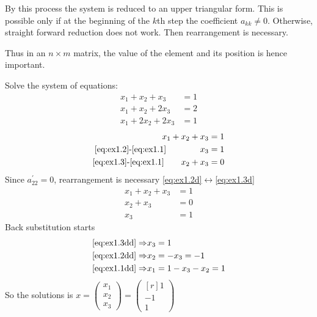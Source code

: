 \documentclass[12pt,class=book,crop=false]{standalone}
\begin{document}
By this process the system is reduced to an upper triangular form. This is possible only if at the beginning of the \( k \)th step the coefficient \( a_{kk} \neq 0\). Otherwise, straight forward reduction does not work. Then rearrangement is necessary.

Thus in an \( n\times m \) matrix, the value of the element and its position is hence important.
\begin{ex}
    Solve the system of equations:
    \begin{align}
        x_1+x_2+x_3   & = 1 \label{eq:ex1.1} \\
        x_1+x_2+2x_3  & = 2 \label{eq:ex1.2} \\
        x_1+2x_2+2x_3 & = 1 \label{eq:ex1.3}
    \end{align}
    \begin{align}
        x_1+x_2+x_3                                              & = 1 \label{eq:ex1.1d} \\
        \text{\eqref{eq:ex1.2}-\eqref{eq:ex1.1}}\qquad\qquad x_3 & = 1 \label{eq:ex1.2d} \\
        \text{\eqref{eq:ex1.3}-\eqref{eq:ex1.1}}\qquad x_2+x_3   & = 0 \label{eq:ex1.3d}
    \end{align}
    Since \( a_{22}^{'} =0 \), rearrangement is necessary \eqref{eq:ex1.2d}\( \longleftrightarrow \)\eqref{eq:ex1.3d}
    \begin{align}
        x_1+x_2+x_3 & = 1 \label{eq:ex1.1dd} \\
        x_2+x_3     & = 0 \label{eq:ex1.2dd} \\
        x_3         & = 1 \label{eq:ex1.3dd}
    \end{align}
    Back substitution starts
    \begin{align*}
        \eqref{eq:ex1.3dd} \Rightarrow & x_3=1           \\
        \eqref{eq:ex1.2dd} \Rightarrow & x_2=-x_3=-1     \\
        \eqref{eq:ex1.1dd} \Rightarrow & x_1=1-x_3-x_2=1
    \end{align*}
    So the solutions is \( x=\begin{pmatrix}
            x_1 \\
            x_2 \\
            x_3
        \end{pmatrix} =\begin{pmatrix*}[r]
            1  \\
            -1 \\
            1
        \end{pmatrix*} \)
\end{ex}
\end{document}
